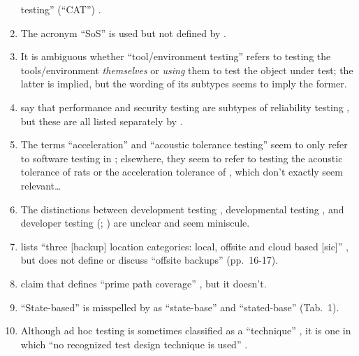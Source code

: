 \begin{enumerate}
            testing'' (``CAT'') \citep[p.~30]{Firesmith2015}.
      \item The acronym ``SoS'' is used but not defined by
            \citet[p.~23]{Firesmith2015}.
      \item It is ambiguous whether ``tool/environment testing'' refers to
            testing the tools/environment \emph{themselves} or \emph{using}
            them to test the object under test; the latter is implied, but the
            wording of its subtypes \citep[p.~25]{Firesmith2015} seems to imply
            the former.
      \item \citeauthor{ISO_IEC2023a} say that performance and security testing
            are subtypes of reliability testing \citeyearpar{ISO_IEC2023a}, but
            these are all listed separately by \citet[p.~53]{Firesmith2015}.
      \item The terms ``acceleration'' and ``acoustic tolerance testing'' seem
            to only refer to software testing in \citep[p.~56]{Firesmith2015};
            elsewhere, they seem to refer to testing the acoustic tolerance of
            rats \citep{HolleyEtAl1996} or the acceleration tolerance of
            \accelTolTest{}, which don't exactly seem relevant\dots
      \item The distinctions between development testing \citep[p.~136]{IEEE2017},
            developmental testing \citep[p.~30]{Firesmith2015}, and developer
            testing (\citealp[p.~39]{Firesmith2015}; \citealp[p.~11]{Gerrard2000a})
            are unclear and seem miniscule.
      \item \citeauthor{Bas2024} lists ``three [backup] location categories:
            local, offsite and cloud based [sic]'' \citeyearpar[p.~16]{Bas2024},
            but does not define or discuss ``offsite backups'' (pp.~16-17).
      \item \citeauthor{DoğanEtAl2014} claim that \citep{SakamotoEtAl2013}
            defines ``prime path coverage'' \citeyearpar[p.~184]{DoğanEtAl2014},
            but it doesn't.
      \item ``State-based'' is misspelled by \citeauthor{Kam2008} as
            ``state-base'' \citeyearpar[pp.~13,~15]{Kam2008} and
            ``stated-base'' (Tab.~1).
      \item Although ad hoc testing is sometimes classified as a ``technique''
            \citep[p.~5-14]{SWEBOK2024}, it is one in which ``no recognized test
            design technique is used'' \citep[p.~42]{Kam2008}.

\end{enumerate}
